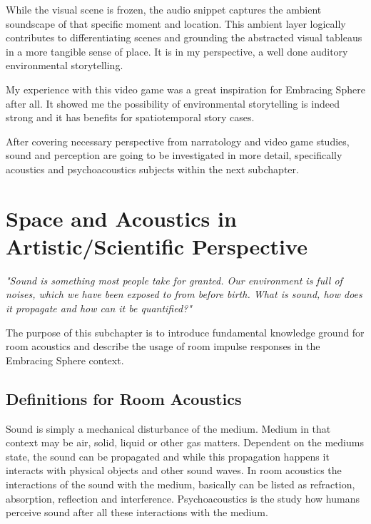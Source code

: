             While the visual scene is frozen, the audio snippet captures the ambient soundscape of that specific moment and location. This ambient layer logically contributes to differentiating scenes and grounding the abstracted visual tableaus in a more tangible sense of place. It is in my perspective, a well done auditory environmental storytelling.\par           

            My experience with this video game was a great inspiration for Embracing Sphere after all. It showed me the possibility of environmental storytelling is indeed strong and it has benefits for spatiotemporal story cases.\par

            After covering necessary perspective from narratology and video game studies, sound and perception are going to be investigated in more detail, specifically acoustics and psychoacoustics subjects within the next subchapter.
    \section{Space and Acoustics in Artistic/Scientific Perspective}
            \emph{"Sound is something most people take for granted. Our environment is full of noises, which we have been exposed to from before birth. What is sound, how does it propagate and how can it be quantified?"\cite{Acoustics_and_Psychophysics}}\par 

            The purpose of this subchapter is to introduce fundamental knowledge ground for room acoustics and describe the usage of room impulse responses in the Embracing Sphere context.\par
        \subsection{Definitions for Room Acoustics}
            Sound is simply a mechanical disturbance of the medium. Medium in that context may be air, solid, liquid or other gas matters. Dependent on the mediums state, the sound can be propagated and while this propagation happens it interacts with physical objects and other sound waves. In room acoustics the interactions of the sound with the medium, basically can be listed as refraction, absorption, reflection and interference. Psychoacoustics is the study how humans perceive sound after all these interactions with the medium\cite{Acoustics_and_Psychophysics}.\par

